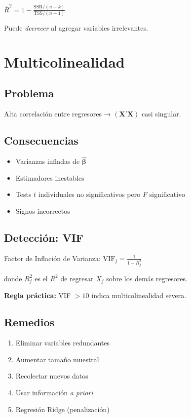 \documentclass[9pt, spanish, twoside]{article}
\newcommand{\critical}[1]{\textcolor{CriticalRed}{\textbf{#1}}}
\newcommand{\eqbox}[1]{\colorbox{TitaniumGray}{$\displaystyle #1$}}
\begin{document}
\begin{multicols*}{3}
\eqbox{\bar{R}^2 = 1 - \frac{\text{SSR}/(n-k)}{\text{TSS}/(n-1)}}


Puede \textit{decrecer} al agregar variables irrelevantes.

\section{Multicolinealidad}
\subsection{Problema}
Alta correlación entre regresores → $(\mathbf{X}'\mathbf{X})$ casi singular.

\subsection{Consecuencias}
\begin{itemize}[leftmargin=8pt, noitemsep, topsep=2pt]
    \item Varianzas infladas de $\hat{\boldsymbol{\beta}}$
    \item Estimadores inestables
    \item Tests $t$ individuales no significativos pero $F$ significativo
    \item Signos incorrectos
\end{itemize}

\subsection{Detección: VIF}
Factor de Inflación de Varianza:
\eqbox{\text{VIF}_j = \frac{1}{1 - R_j^2}}

donde $R_j^2$ es el $R^2$ de regresar $X_j$ sobre los demás regresores.

\critical{Regla práctica:} VIF $> 10$ indica multicolinealidad severa.

\subsection{Remedios}
\begin{enumerate}[leftmargin=8pt, noitemsep, topsep=2pt]
    \item Eliminar variables redundantes
    \item Aumentar tamaño muestral
    \item Recolectar nuevos datos
    \item Usar información \textit{a priori}
    \item Regresión Ridge (penalización)
\end{enumerate}


\end{multicols*}
\end{document}
